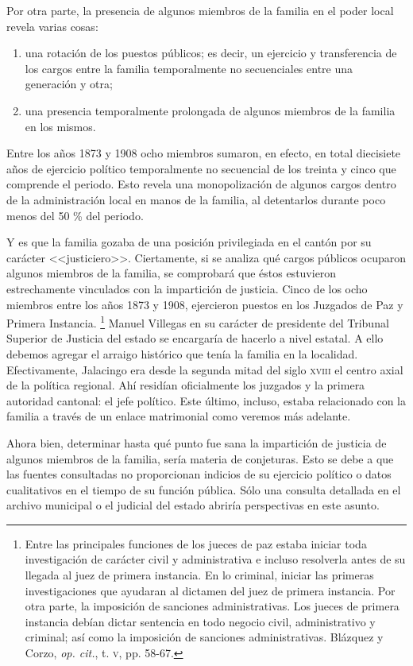 \documentclass[14pt,twoside,final]{extbook} %
\let\oldfootnote\footnote
\renewcommand\footnote[1]{%
\oldfootnote{\hspace{1mm}#1}}
\begin{document}
Por otra parte, la presencia de algunos miembros de la familia en el poder local revela varias cosas:
\begin{enumerate}[noitemsep]
\item una rotación de los puestos públicos; es decir, un ejercicio y transferencia de los cargos entre la familia temporalmente no secuenciales entre una generación y otra; 
\item una presencia temporalmente prolongada de algunos miembros de la familia en los mismos.
\end{enumerate}
Entre los años 1873 y 1908 ocho miembros sumaron, en efecto, en total diecisiete años de ejercicio político temporalmente no secuencial de los treinta y cinco que comprende el periodo. Esto revela una monopolización de algunos cargos dentro de la administración local en manos de la familia, al detentarlos durante poco menos del 50 \% del periodo.

Y es que la familia gozaba de una posición privilegiada en el cantón por su carácter <<justiciero>>. Ciertamente, si se analiza qué cargos públicos ocuparon algunos miembros de la familia, se comprobará que éstos estuvieron estrechamente vinculados con la impartición de justicia. Cinco de los ocho miembros entre los años 1873 y 1908, ejercieron puestos en los Juzgados de Paz y Primera Instancia.\footnote{Entre las principales funciones de los jueces de paz estaba iniciar toda investigación de carácter civil y administrativa e incluso resolverla antes de su llegada al juez de primera instancia. En lo criminal, iniciar las primeras investigaciones que ayudaran al dictamen del juez de primera instancia. Por otra parte, la imposición de sanciones administrativas. Los jueces de primera instancia debían dictar sentencia en todo negocio civil, administrativo y criminal; así como la imposición de sanciones administrativas. Blázquez y Corzo, \emph{op. cit.}, t. \textsc{v}, pp. 58-67.} Manuel Villegas en su carácter de presidente del Tribunal Superior de Justicia del estado se encargaría de hacerlo a nivel estatal. A ello debemos agregar el arraigo histórico que tenía la familia en la localidad. Efectivamente, Jalacingo era desde la segunda mitad del siglo \textsc{xviii} el centro axial de la política regional. Ahí residían oficialmente los juzgados y la primera autoridad cantonal: el jefe político. Este último, incluso, estaba relacionado con la familia a través de un enlace matrimonial como veremos más adelante.

Ahora bien, determinar hasta qué punto fue sana la impartición de justicia de algunos miembros de la familia, sería materia de conjeturas. Esto se debe a que las fuentes consultadas no proporcionan indicios de su ejercicio político o datos cualitativos en el tiempo de su función pública. Sólo una consulta detallada en el archivo municipal o el judicial del estado abriría perspectivas en este asunto.
\end{document}
